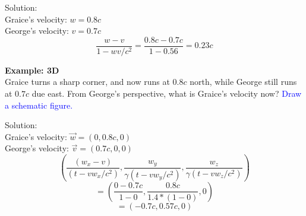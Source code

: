 Solution:\\
Graice's velocity: $w=0.8c$ \\
George's velocity: $v=0.7c$ \\

\[ \frac{w-v}{1-wv/c^2} = \frac{0.8c - 0.7c}{1-0.56} = 0.23c\]

\textbf{Example: 3D} \\
Graice turns a sharp corner, and now runs at $0.8c$ north, while George still runs at $0.7c$ due east. From George's perspective, what is Graice's
velocity now?
\textcolor{blue}{Draw a schematic figure.}

Solution: \\
Graice's velocity: $\overrightarrow{w}=(0,0.8c,0)$ \\
George's velocity: $\overrightarrow{v}=(0.7c,0,0)$ \\

\[ (\frac{(w_x - v)}{(t - vw_x/c^2)}, \frac{w_y}{\gamma (t-vw_y/c^2)}, \frac{w_z}{\gamma (t-vw_z/c^2)})\]
\[ = (\frac{0-0.7c}{1-0},\frac{0.8c}{1.4*(1-0)},0)\]
\[= (-0.7c, 0.57c, 0)\]